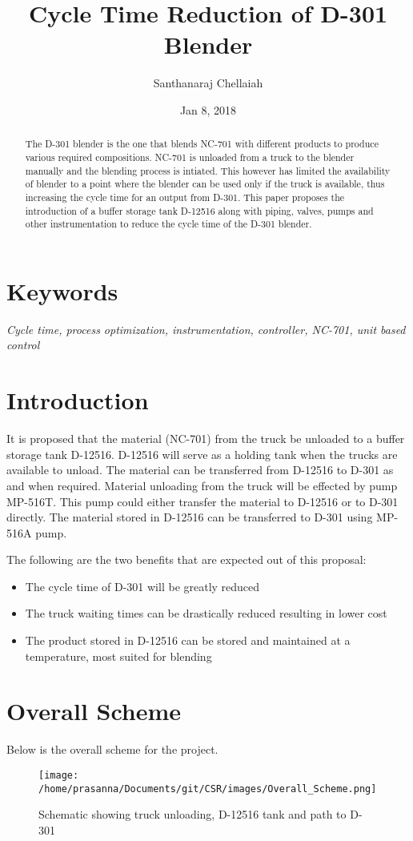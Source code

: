 \documentclass[a4paper,oneside]{article}
\author{Santhanaraj Chellaiah}
\date{Jan 8, 2018}
\title{Cycle Time Reduction of D-301 Blender}
\begin{document}
\maketitle
\begin{abstract}
The D-301 blender is the one that blends NC-701 with different
products to produce various required compositions. NC-701 is unloaded
from a truck to the blender manually and the blending process is
intiated. This however has limited the availability of blender to a
point where the blender can be used only if the truck is available,
thus increasing the cycle time for an output from D-301. This paper
proposes the introduction of a buffer storage tank D-12516 along with
piping, valves, pumps and other instrumentation to reduce the cycle
time of the D-301 blender.
\end{abstract}

\section{Keywords}
\label{sec:org6253fd0}
\emph{Cycle time, process optimization, instrumentation, controller, NC-701, unit based control}

\section{Introduction}
\label{sec:org5204594}
It is proposed that the material (NC-701) from the truck be unloaded
to a buffer storage tank D-12516. D-12516 will serve as a holding tank
when the trucks are available to unload. The material can be
transferred from D-12516 to D-301 as and when required. Material
unloading from the truck will be effected by pump MP-516T. This pump
could either transfer the material to D-12516 or to D-301
directly. The material stored in D-12516 can be transferred to D-301
using MP-516A pump.  

The following are the two benefits that are expected out of this proposal: 
\begin{itemize}
\item The cycle time of D-301 will be greatly reduced
\item The truck waiting times can be drastically reduced resulting in lower cost
\item The product stored in D-12516 can be stored and maintained at a
temperature, most suited for blending
\end{itemize}
\section{Overall Scheme}
\label{sec:org8d85a47}
Below is the overall scheme for the project. 
\begin{figure}[htbp]
\centering
\texttt{[image: /home/prasanna/Documents/git/CSR/images/Overall\_Scheme.png]}
\caption{Schematic showing truck unloading, D-12516 tank and path to D-301}
\end{figure}
\end{document}
